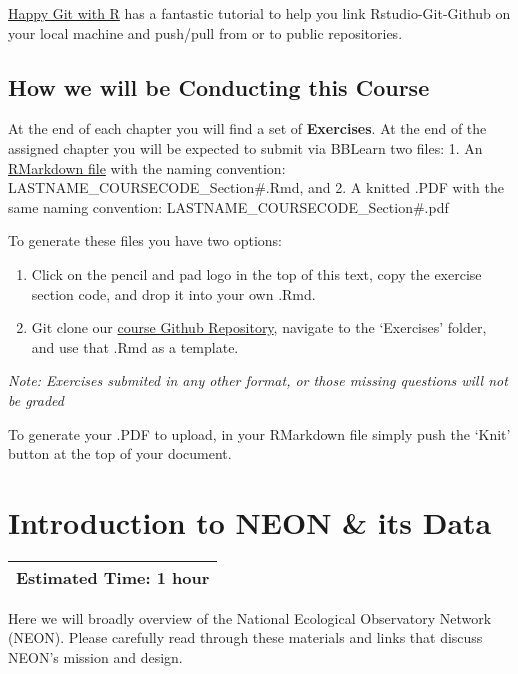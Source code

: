 \documentclass[]{book}
\providecommand{\tightlist}{%
  \setlength{\itemsep}{0pt}\setlength{\parskip}{0pt}}
\begin{document}
\href{https://happygitwithr.com/rstudio-git-github.html}{Happy Git with R} has a fantastic tutorial to help you link Rstudio-Git-Github on your local machine and push/pull from or to public repositories.

\hypertarget{how-we-will-be-conducting-this-course}{%
\section{How we will be Conducting this Course}\label{how-we-will-be-conducting-this-course}}

At the end of each chapter you will find a set of \textbf{Exercises}. At the end of the assigned chapter you will be expected to submit via BBLearn two files:
1. An \href{https://rstudio.com/wp-content/uploads/2015/02/rmarkdown-cheatsheet.pdf}{RMarkdown file} with the naming convention:
LASTNAME\_COURSECODE\_Section\#.Rmd, and
2. A knitted .PDF with the same naming convention:
LASTNAME\_COURSECODE\_Section\#.pdf

To generate these files you have two options:

\begin{enumerate}
\def\labelenumi{\arabic{enumi}.}
\tightlist
\item
  Click on the pencil and pad logo in the top of this text, copy the exercise section code, and drop it into your own .Rmd.
\item
  Git clone our \href{https://github.com/katharynduffy/katharynduffy.github.io}{course Github Repository}, navigate to the `Exercises' folder, and use that .Rmd as a template.
\end{enumerate}

\emph{Note: Exercises submited in any other format, or those missing questions will not be graded}

To generate your .PDF to upload, in your RMarkdown file simply push the `Knit' button at the top of your document.

\hypertarget{introduction-to-neon-its-data}{%
\chapter{Introduction to NEON \& its Data}\label{introduction-to-neon-its-data}}

\begin{longtable}[]{@{}l@{}}
\toprule
\endhead
Estimated Time: 1 hour\tabularnewline
\bottomrule
\end{longtable}

Here we will broadly overview of the National Ecological Observatory
Network (NEON). Please carefully read through these materials and links that
discuss NEON's mission and design.
\end{document}
